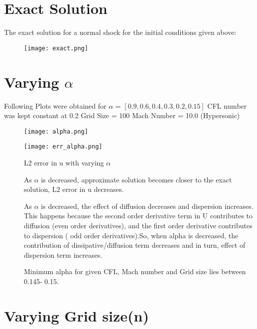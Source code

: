 \documentclass{article}
\begin{document}
\section*{Exact Solution}
The exact solution for a normal shock for the initial conditions given above:

\begin{figure}[H]   \label{figure}
\texttt{[image: exact.png]}
\label{figure:}
\end{figure}
\newpage
\section*{Varying $\alpha$}

Following Plots were obtained for $\alpha$ = $[0.9 , 0.6 ,0.4, 0.3, 0.2, 0.15 ]$
\newline
CFL number was kept constant at 0.2
\newline
Grid Size = 100
\newline
Mach Number = 10.0 (Hypersonic)

\begin{figure}[H]   \label{figure}
\texttt{[image: alpha.png]}
\label{figure:}
\end{figure}

\begin{figure}[H]   \label{figure}
\texttt{[image: err\_alpha.png]}
\caption{ L2 error in u with varying $\alpha$}
\label{figure:}
\end{figure}

\begin{description}
\item[]As $\alpha$ is decreased, approximate solution becomes closer to the exact solution, L2 error in u decreases.
\item[]As $\alpha$ is decreased, the effect of diffusion decreases and dispersion increases. This happens because the second order derivative term in U contributes to diffusion (even order derivatives), and the first order derivative contributes to dispersion ( odd order derivatives).So, when alpha is decreased, the contribution of dissipative/diffusion term decreases and in turn, effect of dispersion term increases.
\item[]Minimum alpha for given CFL, Mach number and Grid size lies between 0.145- 0.15.

\end{description}
\newpage

\section*{Varying Grid size(n)}
\end{document}
